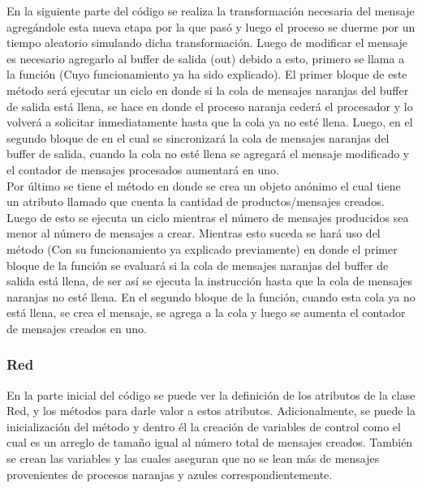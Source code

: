 \documentclass[a4paper]{article}
\begin{document}
    En la siguiente parte del c\'odigo se realiza la transformaci\'on necesaria del mensaje agreg\'andole esta nueva etapa por la que pas\'o y luego el proceso se duerme por un tiempo aleatorio simulando dicha transformaci\'on.
    Luego de modificar el mensaje es necesario agregarlo al buffer de salida (out) debido a esto, primero se llama a la funci\'on  (Cuyo funcionamiento ya ha sido explicado).
    El primer bloque de este m\'etodo ser\'a ejecutar un ciclo en donde si la cola de mensajes naranjas del buffer de salida est\'a llena, se hace  en donde el proceso naranja ceder\'a el procesador y lo volver\'a a solicitar inmediatamente hasta que la cola ya no est\'e llena.
    Luego, en el segundo bloque de en el cual se sincronizar\'a la cola de mensajes naranjas del buffer de salida, cuando la cola no est\'e llena se agregar\'a el mensaje modificado y el contador de mensajes procesados aumentar\'a en uno.\\

    Por \'ultimo se tiene el m\'etodo  en donde se crea un objeto an\'onimo  el cual tiene un atributo llamado  que cuenta la cantidad de productos/mensajes creados.
    Luego de esto se ejecuta un ciclo mientras el n\'umero de mensajes producidos sea menor al n\'umero de mensajes a crear.
    Mientras esto suceda se har\'a uso del m\'etodo  (Con su funcionamiento ya explicado previamente) en donde el primer bloque de la funci\'on se evaluar\'a si la cola de mensajes naranjas del buffer de salida est\'a llena, de ser as\'i se ejecuta la instrucci\'on  hasta que la cola de mensajes naranjas no est\'e llena.
    En el segundo bloque de la funci\'on, cuando esta cola ya no est\'a llena, se crea el mensaje, se agrega a la cola y luego se aumenta el contador de mensajes creados en uno.

    \subsubsection{Red}
    En la parte inicial del c\'odigo se puede ver la definici\'on de los atributos de la clase Red, y los m\'etodos para darle valor a estos atributos.
    Adicionalmente, se puede la inicializaci\'on del m\'etodo  y dentro \'el la creaci\'on de variables de control como  el cual es un arreglo de tama\~no igual al n\'umero total de mensajes creados.
    Tambi\'en se crean las variables  y  las cuales aseguran que no se lean m\'as de  mensajes provenientes de procesos naranjas y azules correspondientemente.\\
\end{document}
